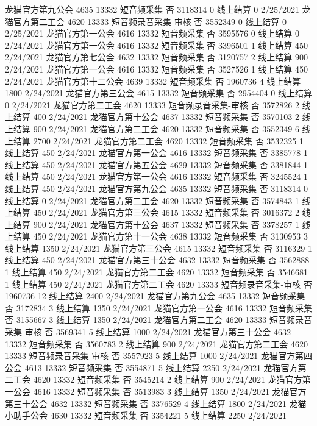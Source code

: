 龙猫官方第九公会	4635	13332	短音频采集	否	3118314	0	线上结算	0	2/25/2021
龙猫官方第二工会	4620	13333	短音频录音采集-审核	否	3552349	0	线上结算	0	2/25/2021
龙猫官方第一公会	4616	13332	短音频采集	否	3595576	0	线上结算	0	2/24/2021
龙猫官方第一公会	4616	13332	短音频采集	否	3396501	1	线上结算	450	2/24/2021
龙猫官方第七公会	4632	13332	短音频采集	否	3120757	2	线上结算	900	2/24/2021
龙猫官方第一公会	4616	13332	短音频采集	否	3527526	1	线上结算	450	2/24/2021
龙猫官方第十二公会	4639	13332	短音频采集	否	1960736	4	线上结算	1800	2/24/2021
龙猫官方第三公会	4615	13332	短音频采集	否	2954404	0	线上结算	0	2/24/2021
龙猫官方第二工会	4620	13333	短音频录音采集-审核	否	3572826	2	线上结算	400	2/24/2021
龙猫官方第十公会	4637	13332	短音频采集	否	3570103	2	线上结算	900	2/24/2021
龙猫官方第二工会	4620	13332	短音频采集	否	3552349	6	线上结算	2700	2/24/2021
龙猫官方第二工会	4620	13332	短音频采集	否	3532325	1	线上结算	450	2/24/2021
龙猫官方第一公会	4616	13332	短音频采集	否	3385778	1	线上结算	450	2/24/2021
龙猫官方第五公会	4629	13332	短音频采集	否	3381844	1	线上结算	450	2/24/2021
龙猫官方第一公会	4616	13332	短音频采集	否	3245524	1	线上结算	450	2/24/2021
龙猫官方第九公会	4635	13332	短音频采集	否	3118314	0	线上结算	0	2/24/2021
龙猫官方第二工会	4620	13332	短音频采集	否	3574843	1	线上结算	450	2/24/2021
龙猫官方第三公会	4615	13332	短音频采集	否	3016372	2	线上结算	900	2/24/2021
龙猫官方第十公会	4637	13332	短音频采集	否	3378257	1	线上结算	450	2/24/2021
龙猫官方第十一公会	4638	13332	短音频采集	否	3130953	3	线上结算	1350	2/24/2021
龙猫官方第三公会	4615	13332	短音频采集	否	3116329	1	线上结算	450	2/24/2021
龙猫官方第三十公会	4632	13332	短音频采集	否	3562888	1	线上结算	450	2/24/2021
龙猫官方第二工会	4620	13332	短音频采集	否	3546681	1	线上结算	450	2/24/2021
龙猫官方第二工会	4620	13333	短音频录音采集-审核	否	1960736	12	线上结算	2400	2/24/2021
龙猫官方第九公会	4635	13332	短音频采集	否	3172834	3	线上结算	1350	2/24/2021
龙猫官方第一公会	4616	13332	短音频采集	否	3155667	3	线上结算	1350	2/24/2021
龙猫官方第二工会	4620	13333	短音频录音采集-审核	否	3569341	5	线上结算	1000	2/24/2021
龙猫官方第三十公会	4632	13332	短音频采集	否	3560783	2	线上结算	900	2/24/2021
龙猫官方第二工会	4620	13333	短音频录音采集-审核	否	3557923	5	线上结算	1000	2/24/2021
龙猫官方第四公会	4613	13332	短音频采集	否	3554871	5	线上结算	2250	2/24/2021
龙猫官方第二工会	4620	13332	短音频采集	否	3545214	2	线上结算	900	2/24/2021
龙猫官方第一公会	4616	13332	短音频采集	否	3513983	3	线上结算	1350	2/24/2021
龙猫官方第三十公会	4632	13332	短音频采集	否	3376529	4	线上结算	1800	2/24/2021
龙猫小助手公会	4630	13332	短音频采集	否	3354221	5	线上结算	2250	2/24/2021
